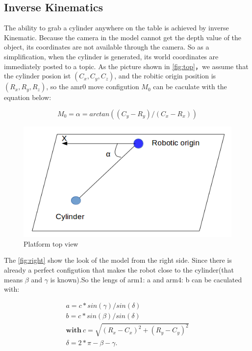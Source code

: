 \subsection{Inverse Kinematics}

The ability to grab a cylinder anywhere on the table is achieved by inverse Kinematic. Because the camera in the model cannot get the depth value of the object, its coordinates are not available through the camera. So as a simplification, when the cylinder is generated, its world coordinates are immediately posted to a topic. As the picture shown in \autoref{fig:top}，we assume that the cylinder posion ist $(C_x, C_y, C_z)$, and the robitic origin position is  $(R_x, R_y, R_z)$, so the amr0 move configution $M_0$ can be caculate with the equation below:


\begin{equation}
\label{simple_equation}
M_0=\alpha = arctan((C_y-R_y)/(C_x-R_x))
\end{equation}









\begin{figure}[htpb]
\centering
	\includegraphics[width=0.96\linewidth]{figures/top_view.png} 
	\caption{Platform top view}
	\vspace{-0.4cm}
	\label{fig:top}
\end{figure}


The \autoref{fig:right} show the look of the model from the right side. Since there is already a perfect configution that makes the robot close to the cylinder(that means $\beta$ and $\gamma$ is known).So the lengs of arm1: a and arm4: b can be caculated with:

\begin{equation}
\begin{aligned}
a=c*sin(\gamma)/sin(\delta)\\b=c*sin(\beta)/sin(\delta)\\ 
\textbf{with}\ c=\sqrt{(R_x-C_x)^2+(R_y-C_y)^2}\\\delta=2*\pi-\beta-\gamma.
\end{aligned}
\end{equation}



